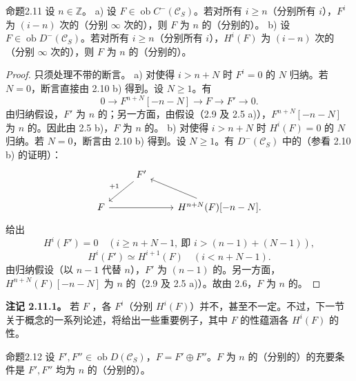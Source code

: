 \begin{SGAresult}{命题}{2.11}
设 $n\in\mathbb Z$。
a) 设 $F\in\operatorname{ob}C^-(\mathscr C_S)$。若对所有 $i\geq n$（分别所有 $i$），$F^i$ 为 $(i-n)$ 次的（分别 $\infty$ 次的），则 $F$ 为 $n$ 的（分别的）。
b) 设 $F\in\operatorname{ob}D^-(\mathscr C_S)$。若对所有 $i\geq n$（分别所有 $i$），$H^i(F)$ 为 $(i-n)$ 次的（分别 $\infty$ 次的），则 $F$ 为 $n$ 的（分别的）。
\end{SGAresult}
\begin{proof}
只须处理不带的断言。
a) 对使得 $i>n+N$ 时 $F^i=0$ 的 $N$ 归纳。若 $N=0$，断言直接由 2.10 b) 得到。设 $N\geq1$。有
\[0\longrightarrow F^{n+N}[-n-N]\longrightarrow F\longrightarrow F'\longrightarrow0.\]
由归纳假设，$F'$ 为 $n$ 的；另一方面，由假设（2.9 及 2.5 a)），$F^{n+N}[-n-N]$ 为 $n$ 的。因此由 2.5 b)，$F$ 为 $n$ 的。
b) 对使得 $i>n+N$ 时 $H^i(F)=0$ 的 $N$ 归纳。若 $N=0$，断言由 2.10 b) 得到。设 $N\geq1$。有 $D^-(\mathscr C_S)$ 中的（参看 2.10 b) 的证明）：
\[\begin{tikzcd}&F'\arrow[dl,"+1"']&\\F\arrow[rr]&&H^{n+N}(F)[-n-N]\arrow[ul].\end{tikzcd}\]
给出
\[H^i(F')=0\quad(i\geq n+N-1,\ \text{即 }i>(n-1)+(N-1)),\]
\[H^i(F')\simeq H^{i+1}(F)\quad(i<n+N-1).\]
由归纳假设（以 $n-1$ 代替 $n$），$F'$ 为 $(n-1)$ 的。另一方面，$H^{n+N}(F)[-n-N]$ 为 $n$ 的（2.9 及 2.5 a)）。故由 2.6，$F$ 为 $n$ 的。
\end{proof}
\textbf{注记 2.11.1。} 若 $F$ ，各 $F^i$（分别 $H^i(F)$）并不，甚至不一定。不过，下一节关于概念的一系列论述，将给出一些重要例子，其中 $F$ 的性蕴涵各 $H^i(F)$ 的性。
\begin{SGAresult}{命题}{2.12}
设 $F',F''\in\operatorname{ob}D(\mathscr C_S)$，$F=F'\oplus F''$。$F$ 为 $n$ 的（分别的）的充要条件是 $F',F''$ 均为 $n$ 的（分别的）。
\end{SGAresult}

